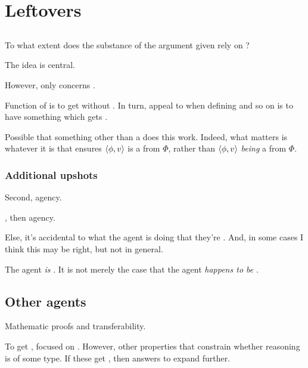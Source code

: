 
\chapter{Leftovers}
\label{cha:leftovers}


\section{}
\label{sec:fc3}


\begin{note}
  To what extent does the substance of the argument given rely on ?

  The idea is central.

  However, \qWhy{}  only concerns .

  Function of  is to get \ros{} without \wit{}.
  In turn, appeal to  when defining  and so on is to have something which gets \ros{}.

  Possible that something other than a \fc{} does this work.
  Indeed, what matters is whatever it is that ensures \(\langle\phi, v\rangle\) is a \fc{} from \(\Phi\), rather than \(\langle\phi, v\rangle\) \emph{being} a \fc{} from \(\Phi\).
\end{note}



\subsection{Additional upshots}


\begin{note}
  Second, agency.

  \tCV{}, then agency.

  Else, it's accidental to what the agent is doing that they're \tCV{}.
  And, in some cases I think this may be right, but not in general.

  The agent \emph{is} \tCV{}.
  It is not merely the case that the agent \emph{happens to be} \tCV{}.
\end{note}




\section{Other agents}
\label{sec:other-agents}


\begin{note}
  Mathematic proofs and transferability.

  To get , focused on \tC{}.
  However, other properties that constrain whether reasoning is of some type.
  If these get \ros{}, then answers to \qWhy{} expand further.
\end{note}

